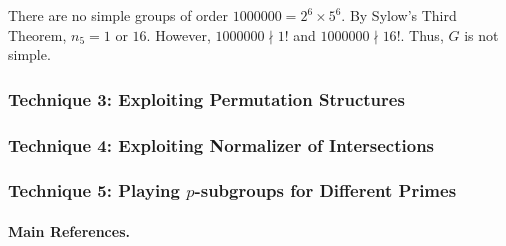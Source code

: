 \begin{example}
	There are no simple groups of order $1000000 = 2^6 \times 5^6$. By Sylow's Third Theorem, $n_5 = 1 \text{~or~} 16$. However, $1000000 \nmid 1!$ and $1000000 \nmid 16!$. Thus, $G$ is not simple.
\end{example}

\subsubsection{Technique 3: Exploiting Permutation Structures}
\subsubsection{Technique 4: Exploiting Normalizer of Intersections}
\subsubsection{Technique 5: Playing $p$-subgroups for Different Primes}

\paragraph{Main References.} \cite{Hungerford1974,DummitFoote2004,Isaacs2009}
